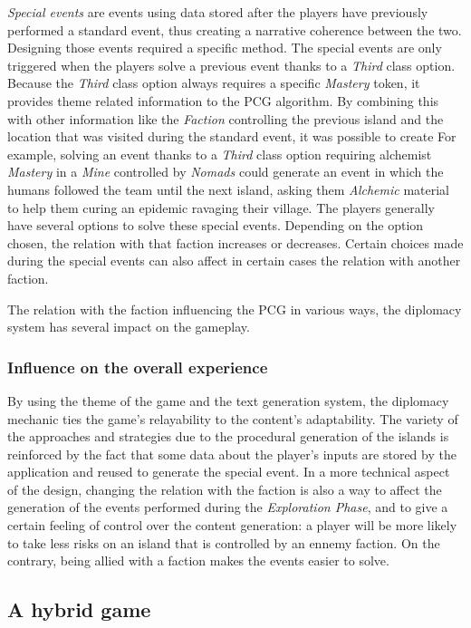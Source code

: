 \textit{Special events} are events using data stored after the players have previously performed a standard event, thus creating a narrative coherence between the two. Designing those events required a specific method. The special events are only triggered when the players solve a previous event thanks to a \textit{Third} class option. Because the \textit{Third} class option always requires a specific \textit{Mastery} token, it provides theme related information to the PCG algorithm. By combining this with other information like the \textit{Faction} controlling the previous island and the location that was visited during the standard event, it was possible to create  For example, solving an event thanks to a \textit{Third} class option requiring  alchemist \textit{Mastery}  in a \textit{Mine} controlled by \textit{Nomads} could generate an event in which the humans followed the team until the next island, asking them \textit{Alchemic} material to help them curing an epidemic ravaging their village. The players generally have several options to solve these special events. Depending on the option chosen, the relation with that faction increases or decreases. Certain choices made during the special events can also affect in certain cases the relation with another faction.  

The relation with the faction influencing the PCG in various ways, the diplomacy system has several impact on the gameplay. 
\subsubsection{Influence on the overall experience}
By using the theme of the game and the text generation system, the diplomacy mechanic ties the game's relayability to the content's adaptability. The variety of the approaches and strategies due to the procedural generation of the islands is reinforced by the fact that some data about the player's inputs are stored by the application and reused to generate the special event. 
In a more technical aspect of the design, changing the relation with the faction is also a way to affect the generation of the events performed during the \textit{Exploration Phase}, and to give a certain feeling of control over the content generation: a player will be more likely to take less risks on an island that is controlled by an ennemy faction. On the contrary, being allied with a faction makes the events easier to solve.
\subsection{A hybrid game}
